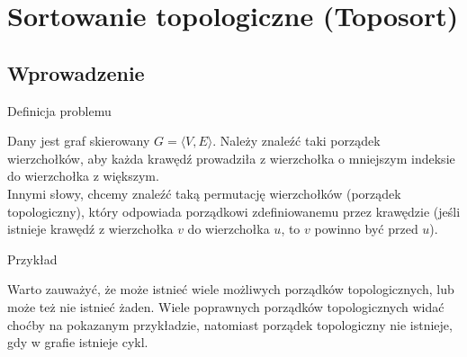 \documentclass[../main.tex]{subfiles}
\begin{document}
\section{Sortowanie topologiczne (Toposort)}

\subsection{Wprowadzenie}

\begin{frame}{\subsecname}{Definicja problemu}

Dany jest graf skierowany $G = \langle V, E \rangle$.
Należy znaleźć taki porządek wierzchołków, aby każda krawędź prowadziła z wierzchołka
o mniejszym indeksie do wierzchołka z większym.\\
Innymi słowy, chcemy znaleźć taką permutację wierzchołków (porządek topologiczny),
który odpowiada porządkowi zdefiniowanemu przez krawędzie (jeśli istnieje krawędź z wierzchołka $v$ do wierzchołka $u$, to $v$ powinno być przed $u$).

\end{frame}

\begin{frame}[fragile]{\subsecname}{Przykład}


\end{frame}

\begin{frame}{\subsecname}

Warto zauważyć, że może istnieć wiele możliwych porządków topologicznych, lub może też nie
istnieć żaden. Wiele poprawnych porządków topologicznych widać choćby na pokazanym przykładzie,
natomiast porządek topologiczny nie istnieje, gdy w grafie istnieje cykl.

\end{frame}
\end{document}
